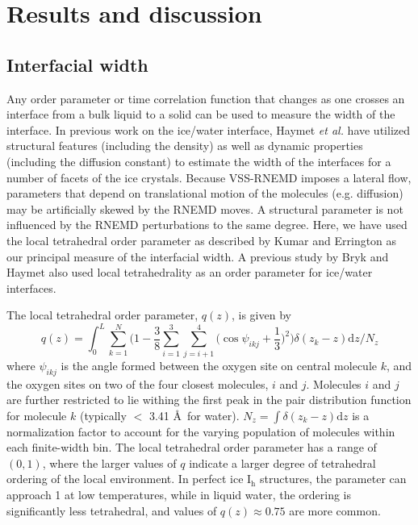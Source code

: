 \section{Results and discussion}

\subsection{Interfacial width}
Any order parameter or time correlation function that changes as one
crosses an interface from a bulk liquid to a solid can be used to
measure the width of the interface.  In previous work on the ice/water
interface, Haymet {\it et al.}\cite{Bryk02} have utilized structural
features (including the density) as well as dynamic properties
(including the diffusion constant) to estimate the width of the
interfaces for a number of facets of the ice crystals.  Because
VSS-RNEMD imposes a lateral flow, parameters that depend on
translational motion of the molecules (e.g. diffusion) may be
artificially skewed by the RNEMD moves.  A structural parameter is not
influenced by the RNEMD perturbations to the same degree. Here, we
have used the local tetrahedral order parameter as described by
Kumar\cite{Kumar09} and Errington\cite{Errington01} as our principal
measure of the interfacial width.  A previous study by Bryk and Haymet
also used local tetrahedrality as an order parameter for ice/water
interfaces.\cite{Bryk2004b}

The local tetrahedral order parameter, $q(z)$, is given by
\begin{equation}
q(z) = \int_0^L \sum_{k=1}^{N} \Bigg(1 -\frac{3}{8}\sum_{i=1}^{3}
\sum_{j=i+1}^{4} \bigg(\cos\psi_{ikj}+\frac{1}{3}\bigg)^2\Bigg)
\delta(z_{k}-z)\mathrm{d}z \Bigg/ N_z
\label{eq:qz}
\end{equation}
where $\psi_{ikj}$ is the angle formed between the oxygen site on
central molecule $k$, and the oxygen sites on two of the four closest
molecules, $i$ and $j$.  Molecules $i$ and $j$ are further restricted
to lie withing the first peak in the pair distribution function for
molecule $k$ (typically $<$ 3.41 \AA\ for water).  $N_z = \int
\delta(z_k - z) \mathrm{d}z$ is a normalization factor to account for
the varying population of molecules within each finite-width bin.  The
local tetrahedral order parameter has a range of $(0,1)$, where the
larger values of $q$ indicate a larger degree of tetrahedral ordering
of the local environment.  In perfect ice I$_\mathrm{h}$ structures,
the parameter can approach 1 at low temperatures, while in liquid
water, the ordering is significantly less tetrahedral, and values of
$q(z) \approx 0.75$ are more common.

